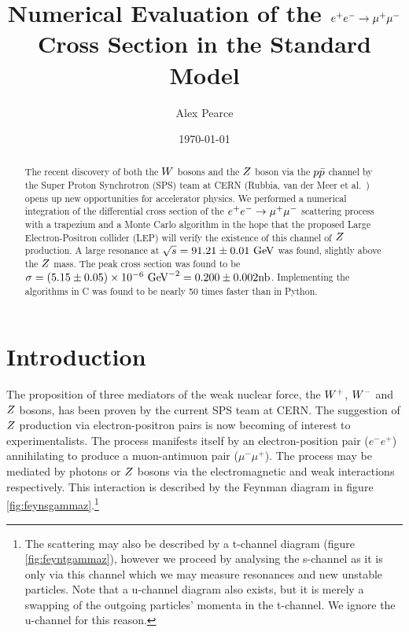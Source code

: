 \documentclass[]{article}
\providecommand{\e}[1]{\ensuremath{\times 10^{#1}}}
\begin{document}
\title{Numerical Evaluation of the $e^+ e^-  \rightarrow \mathrm{\mu^+ \mu^-} $ Cross Section in the Standard Model}
\author{Alex Pearce}
\date{\today}
\maketitle


\begin{abstract}
The recent discovery of both the $W $ bosons and the $Z $ boson via the $p\bar{p}$ channel by the Super Proton Synchrotron (SPS) team at CERN (Rubbia, van der Meer et al.~\cite{ref:wpaper,ref:zpaper}) opens up new opportunities for accelerator physics. We performed a numerical integration of the differential cross section of the $e^+ e^-  \rightarrow \mathrm{\mu^+ \mu^-} $ scattering process with a trapezium and a Monte Carlo algorithm in the hope that the proposed Large Electron-Positron collider (LEP) will verify the existence of this channel of $Z $ production. A large resonance at $\sqrt{s}=91.21\pm0.01\GeV$ was found, slightly above the $Z $ mass. The peak cross section was found to be $\sigma=(5.15\pm0.05)\e{-6}\GeV^{-2}=0.200\pm0.002\mathrm{nb}$. Implementing the algorithms in C was found to be nearly 50 times faster than in Python.
\end{abstract}


\section{Introduction}\label{sec:intro}

The proposition of three mediators of the weak nuclear force, the $W^+ $, $W^- $ and $Z $ bosons, has been proven by the current SPS team at CERN. The suggestion of $Z $ production via electron-positron pairs is now becoming of interest to experimentalists. The process manifests itself by an electron-position pair ($e^{-}e^{+}$) annihilating to produce a muon-antimuon pair ($\mu^{-}\mu^{+}$). The process may be mediated by photons or $Z $ bosons via the electromagnetic and weak interactions respectively. This interaction is described by the Feynman diagram in figure \ref{fig:feynsgammaz}.\footnote{The scattering may also be described by a t-channel diagram (figure \ref{fig:feyntgammaz}), however we proceed by analysing the s-channel as it is only via this channel which we may measure resonances and new unstable particles. Note that a u-channel diagram also exists, but it is merely a swapping of the outgoing particles' momenta in the t-channel. We ignore the u-channel for this reason.}
\end{document}
